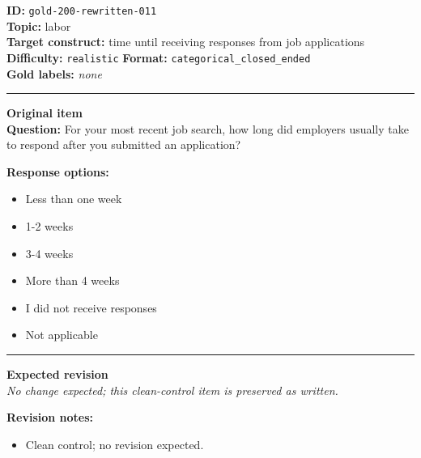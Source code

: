 \documentclass[10pt,a4paper]{article}
\newcommand{\sectionline}{\vspace{0.15em}\hrule\vspace{0.35em}}
\begin{document}
\begin{tcolorbox}[colframe=CleanGreen,colback=white,colbacktitle=CleanGreen!9,coltitle=black,title={Item 011\hfill Clean control}]
\textbf{ID:} \texttt{gold-200-rewritten-011}\\
\textbf{Topic:} labor\\
\textbf{Target construct:} time until receiving responses from job applications\\
\textbf{Difficulty:} \texttt{realistic} \quad \textbf{Format:} \texttt{categorical\_closed\_ended}\\
\textbf{Gold labels:} \textit{none}\\
\sectionline
\textbf{Original item}\\
\textbf{Question:} For your most recent job search, how long did employers usually take to respond after you submitted an application?
\par\textbf{Response options:}
\begin{itemize}
\item Less than one week
\item 1-2 weeks
\item 3-4 weeks
\item More than 4 weeks
\item I did not receive responses
\item Not applicable
\end{itemize}
\sectionline
\textbf{Expected revision}\\
\textit{No change expected; this clean-control item is preserved as written.}
\par\textbf{Revision notes:}
\begin{itemize}
\item Clean control; no revision expected.
\end{itemize}
\end{tcolorbox}
\end{document}
